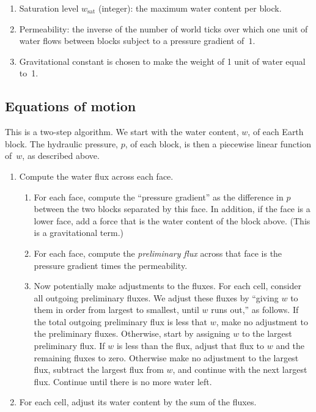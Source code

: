 \documentclass[10pt, a4paper, twocolumn]{article}
\begin{document}
\begin{enumerate}
\item Saturation level $w_{\text{sat}}$ (integer): the maximum water
  content per block.
\item Permeability: the inverse of the number of world ticks over
  which one unit of water flows between blocks subject to a pressure
  gradient of~$1$.
\item Gravitational constant is chosen to make the weight of 1 unit of
  water equal to~1.
\end{enumerate}
  
\subsection{Equations of motion}

This is a two-step algorithm. We start with the water content, $w$, of
each Earth block. The hydraulic pressure, $p$, of each block, is then
a piecewise linear function of~$w$, as described above.

\begin{enumerate}
\item Compute the water flux across each face.
  \begin{enumerate}
  \item For each face, compute the ``pressure gradient'' as the
    difference in $p$ between the two blocks separated by this
    face. In addition, if the face is a lower face, add a force that
    is the water content of the block above. (This is a gravitational
    term.)

  \item For each face, compute the \emph{preliminary flux} across that
    face is the pressure gradient times the permeability.

  \item Now potentially make adjustments to the fluxes. For each cell,
    consider all outgoing preliminary fluxes. We adjust these fluxes
    by ``giving $w$ to them in order from largest to smallest, until
    $w$ runs out,'' as follows. If the total outgoing preliminary flux
    is less that $w$, make no adjustment to the preliminary
    fluxes. Otherwise, start by assigning $w$ to the largest
    preliminary flux. If $w$ is less than the flux, adjust that flux
    to $w$ and the remaining fluxes to zero. Otherwise make no
    adjustment to the largest flux, subtract the largest flux from
    $w$, and continue with the next largest flux. Continue until there
    is no more water left.
  \end{enumerate}

\item For each cell, adjust its water content by the sum of the
  fluxes.
\end{enumerate}
\end{document}
